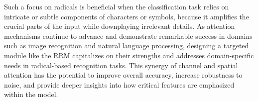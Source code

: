 Such a focus on radicals is beneficial when the classification task relies on intricate or subtle components of characters or symbols, because it amplifies the crucial parts of the input while downplaying irrelevant details. As attention mechanisms continue to advance and demonstrate remarkable success in domains such as image recognition and natural language processing, designing a targeted module like the RRM capitalizes on their strengths and addresses domain-specific needs in radical-based recognition tasks. This synergy of channel and spatial attention has the potential to improve overall accuracy, increase robustness to noise, and provide deeper insights into how critical features are emphasized within the model.
